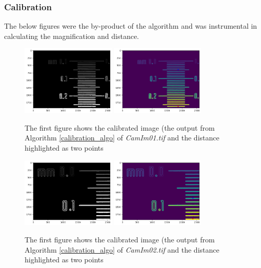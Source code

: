 \documentclass{article}
\begin{document}
\subsubsection*{Calibration}
The below figures were the by-product of the algorithm and was instrumental in calculating the magnification and distance. 
\begin{figure}[h!]
\centering
\includegraphics[width=0.4\textwidth]
{Report/Appendix_Images/processed_image_a1.png}
\includegraphics[width=0.4\textwidth]
{Report/Appendix_Images/processed_image_with_points_a1.png}
\caption{The first figure shows the calibrated image (the output from Algorithm \ref{calibration_algo} of \emph{CamIm01.tif} and the distance highlighted as two points} 
\label{A1_Calibration}
\end{figure}
\begin{figure}[h!]
\centering
\includegraphics[width=0.4\textwidth]
{Report/Appendix_Images/processed_image_a2.png}
\includegraphics[width=0.4\textwidth]
{Report/Appendix_Images/processed_image_with_points_a2.png}
\caption{The first figure shows the calibrated image (the output from Algorithm \ref{calibration_algo} of \emph{CamIm02.tif} and the distance highlighted as two points} 
\label{A2_Calibration}
\end{figure}
\end{document}
